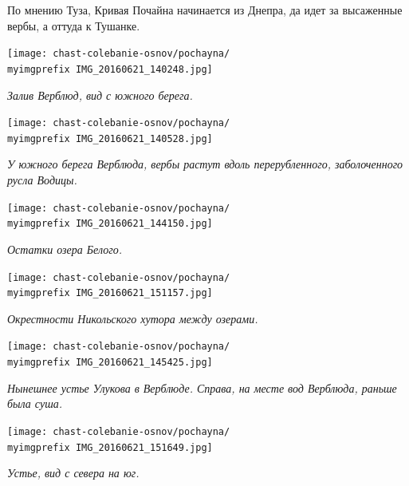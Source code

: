 По мнению Туза, Кривая Почайна начинается из Днепра, да идет за высаженные вербы, а оттуда к Тушанке. 

\newpage

\begin{center}
\texttt{[image: chast-colebanie-osnov/pochayna/\\myimgprefix IMG\_20160621\_140248.jpg]}

\textit{Залив Верблюд, вид с южного берега.}
\end{center}

\begin{center}
\texttt{[image: chast-colebanie-osnov/pochayna/\\myimgprefix IMG\_20160621\_140528.jpg]}

\textit{У южного берега Верблюда, вербы растут вдоль перерубленного, заболоченного русла Водицы.}
\end{center}

\newpage

\begin{center}
\texttt{[image: chast-colebanie-osnov/pochayna/\\myimgprefix IMG\_20160621\_144150.jpg]}

\textit{Остатки озера Белого.}
\end{center}


\begin{center}
\texttt{[image: chast-colebanie-osnov/pochayna/\\myimgprefix IMG\_20160621\_151157.jpg]}

\textit{Окрестности Никольского хутора между озерами.}
\end{center}

\newpage

\begin{center}
\texttt{[image: chast-colebanie-osnov/pochayna/\\myimgprefix IMG\_20160621\_145425.jpg]}

\textit{Нынешнее устье Улукова в Верблюде. Справа, на месте вод Верблюда, раньше была суша.}
\end{center}

\begin{center}
\texttt{[image: chast-colebanie-osnov/pochayna/\\myimgprefix IMG\_20160621\_151649.jpg]}

\textit{Устье, вид с севера на юг.}
\end{center}

\newpage

